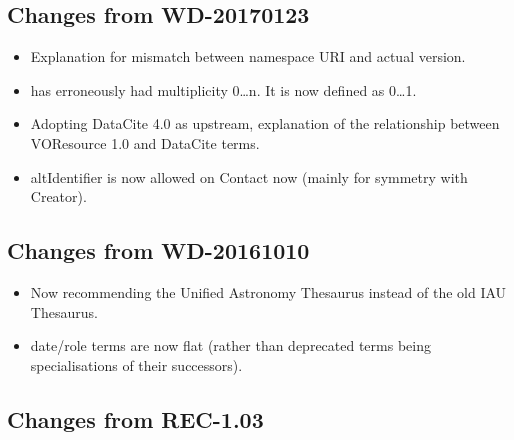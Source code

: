 \documentclass[11pt,a4paper]{ivoa}
\begin{document}
\subsection{Changes from WD-20170123}

\begin{itemize}
\item Explanation for mismatch between namespace URI and actual version.
\item {} has erroneously had multiplicity 0\dots n.
It is now defined as 0\dots 1.
\item Adopting DataCite 4.0 as upstream, explanation of the relationship
between VOResource 1.0 and DataCite terms.
\item altIdentifier is now allowed on Contact now (mainly for symmetry
with Creator).
\end{itemize}

\subsection{Changes from WD-20161010}

\begin{itemize}
\item Now recommending the Unified Astronomy Thesaurus instead of the
old IAU Thesaurus.
\item date/role terms are now flat (rather than deprecated terms being
specialisations of their successors).
\end{itemize}

\subsection{Changes from REC-1.03}
\end{document}
